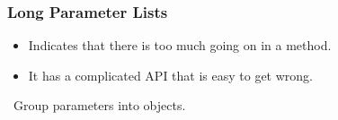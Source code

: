 \begin{frame}

\frametitle{Long Parameter Lists}

\begin{itemize}

\item Indicates that there is too much going on in a method.

\item It has a complicated API that is easy to get wrong.

\end{itemize}

\vspace{\fill}

\begin{center}

\leftthumbsup~Group parameters into objects.~\rightthumbsup

\end{center}

\vspace{\fill}

\end{frame}
